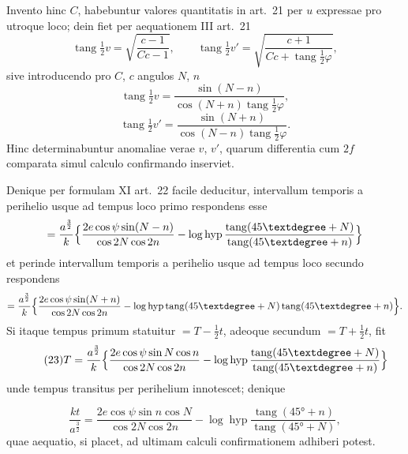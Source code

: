 \documentclass[12pt,a4paper]{article}
\newcommand{\tang}{\mathop{\mathrm{tang}}\nolimits}
\DeclareMathOperator{\hyp}{hyp}
\begin{document}
Invento hinc $C$, habebuntur valores quantitatis in art.~21 per $u$ expressae pro
utroque loco; dein fiet per aequationem III art.~21
\[
\tang\tfrac{1}{2}v = \sqrt{\frac{c - 1}{Cc - 1}}, \qquad
\tang\tfrac{1}{2}v' = \sqrt{\frac{c + 1}{Cc + \tang\frac{1}{2}\varphi}},
\]
sive introducendo pro $C$, $c$ angulos $N$, $n$
\begin{equation}\tag{21}
\tang\tfrac{1}{2}v = \frac{\sin(N - n)}{\cos(N + n)\tang\frac{1}{2}\varphi},
\end{equation}
\begin{equation}\tag{22}
\tang\tfrac{1}{2}v' = \frac{\sin(N + n)}{\cos(N - n)\tang\frac{1}{2}\varphi}.
\end{equation}
Hinc determinabuntur anomaliae verae $v$, $v'$, quarum differentia cum $2f$
comparata simul calculo confirmando inserviet.

Denique per formulam XI art.~22 facile deducitur, intervallum temporis
a perihelio usque ad tempus loco primo respondens esse
\[
= \frac{a^{\frac{3}{2}}}{k}\Bigl\{\frac{2e\cos\psi\sin(N - n)}{\cos 2N\cos 2n} - \log\hyp\frac{\tang(45° + N)}{\tang(45° + n)}\Bigr\}
\]
et perinde intervallum temporis a perihelio usque ad tempus loco secundo
respondens
\[
= \frac{a^{\frac{3}{2}}}{k}\Bigl\{\frac{2e\cos\psi\sin(N + n)}{\cos 2N\cos 2n} - \log\hyp\tang(45° + N)\tang(45° + n)\Bigr\}.
\]
Si itaque tempus primum statuitur $= T - \tfrac{1}{2}t$, adeoque secundum $= T + \tfrac{1}{2}t$, fit
\begin{equation}\tag{23}
T = \frac{a^{\frac{3}{2}}}{k}\Bigl\{\frac{2e\cos\psi\sin N\cos n}{\cos 2N\cos 2n} - \log\hyp\frac{\tang(45° + N)}{\tang(45° + n)}\Bigr\}
\end{equation}
unde tempus transitus per perihelium innotescet; denique

\begin{equation}\tag{24}
\frac{kt}{a^{\frac{3}{2}}} = \frac{2e\cos\psi\sin n\cos N}{\cos 2N\cos 2n} - \log\hyp\frac{\tang(45° + n)}{\tang(45° + N)},
\end{equation}
quae aequatio, si placet, ad ultimam calculi confirmationem adhiberi potest.
\end{document}
